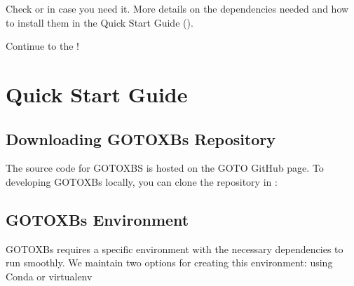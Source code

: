 \documentclass[letterpaper,10pt,english]{sphinxmanual}
\begin{document}
\sphinxAtStartPar
Check  or  in case you need it. More details on the dependencies needed and how to install them in the Quick Start Guide ({\hyperref[\detokenize{quick_start:virtual-env}]{}}).

\sphinxAtStartPar
{} Continue to the {\hyperref[\detokenize{quick_start::doc}]{}}!

\sphinxstepscope


\section{Quick Start Guide}
\label{\detokenize{quick_start:quick-start-guide}}\label{\detokenize{quick_start::doc}}

\subsection{Downloading GOTO\sphinxhyphen{}XBs Repository}
\label{\detokenize{quick_start:downloading-goto-xbs-repository}}
\sphinxAtStartPar
The source code for GOTO\sphinxhyphen{}XBS is hosted on the GOTO GitHub page. To developing GOTO\sphinxhyphen{}XBs locally, you can clone the repository in : 


\subsection{GOTO\sphinxhyphen{}XBs Environment}
\label{\detokenize{quick_start:goto-xbs-environment}}\label{\detokenize{quick_start:virtual-env}}
\sphinxAtStartPar
GOTO\sphinxhyphen{}XBs requires a specific environment with the necessary dependencies to run smoothly. We maintain two options for creating this environment: using Conda or virtualenv
\end{document}
